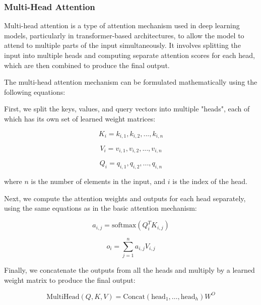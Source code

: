 \subsubsection{Multi-Head Attention}
\label{subsubsec:3_multi_head_attention}

Multi-head attention is a type of attention mechanism used in deep learning models, particularly in transformer-based architectures, to allow the model to attend to multiple parts of the input simultaneously. It involves splitting the input into multiple heads and computing separate attention scores for each head, which are then combined to produce the final output.

The multi-head attention mechanism can be formulated mathematically using the following equations:

First, we split the keys, values, and query vectors into multiple "heads", each of which has its own set of learned weight matrices:

\begin{equation}
	K_i = {k_{i,1}, k_{i,2}, ..., k_{i,n}}
\end{equation}

\begin{equation}
	V_i = {v_{i,1}, v_{i,2}, ..., v_{i,n}}
\end{equation}

\begin{equation}
	Q_i = {q_{i,1}, q_{i,2}, ..., q_{i,n}}
\end{equation}

where $n$ is the number of elements in the input, and $i$ is the index of the head.

Next, we compute the attention weights and outputs for each head separately, using the same equations as in the basic attention mechanism:

\begin{equation}
	a_{i,j} = \text{softmax}(Q_i^T K_{i,j})
\end{equation}

\begin{equation}
	o_{i} = \sum_{j=1}^{n} a_{i,j} V_{i,j}
\end{equation}

Finally, we concatenate the outputs from all the heads and multiply by a learned weight matrix to produce the final output:

\begin{equation}
	\text{MultiHead}(Q, K, V) = \text{Concat}(\text{head}_1, \dots, \text{head}_h)W^O
\end{equation}

